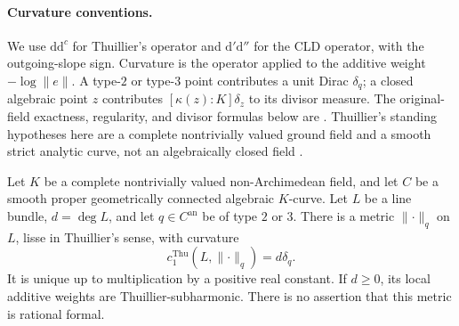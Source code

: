 \paragraph{Curvature conventions.}
We use \(\mathrm d\mathrm d^c\) for Thuillier's operator and
\(\mathrm d'\mathrm d''\) for the CLD operator, with the outgoing-slope
sign.  Curvature is the operator applied to the additive weight
\(-\log\lVert e\rVert\).  A type-\(2\) or type-\(3\) point contributes
a unit Dirac \(\delta_q\); a closed algebraic point \(z\) contributes
\([\kappa(z):K]\delta_z\) to its divisor measure.
The original-field exactness, regularity, and divisor formulas below
are \cite[Proposition~3.3.11, Theorem~3.3.13(ii), and
Proposition~3.3.15]{Thu05}.  Thuillier's standing hypotheses here are a
complete nontrivially valued ground field and a smooth strict analytic
curve, not an algebraically closed field
\cite[opening of Chapter~2, p.~15, and Chapter~3, p.~61]{Thu05}.

\begin{proposition}
\label{prop:ch29-curve-point-reference}
Let \(K\) be a complete nontrivially valued non-Archimedean field, and
let \(C\) be a smooth proper geometrically connected algebraic
\(K\)-curve.  Let \(L\) be a line bundle, \(d=\deg L\), and let
\(q\in C^{\mathrm{an}}\) be of type \(2\) or \(3\).
There is a metric \(\lVert\cdot\rVert_q\) on \(L\), lisse in
Thuillier's sense, with curvature
\begin{equation}
\label{eq:ch29-curve-point-reference-curvature}
            c_1^{\mathrm{Thu}}(L,\lVert\cdot\rVert_q)=d\delta_q.
\end{equation}
It is unique up to multiplication by a positive real constant.  If
\(d\geq0\), its local additive weights are Thuillier-subharmonic.
There is no assertion that this metric is rational formal.
\end{proposition}


